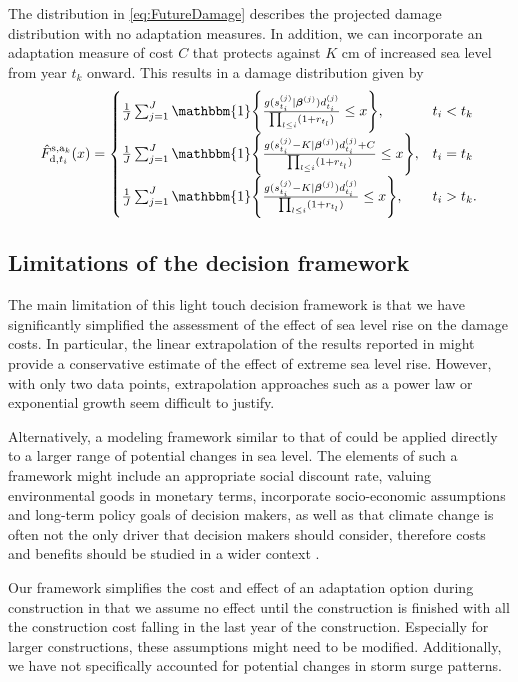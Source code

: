 \documentclass[note,screen,british,11pt]{nrdoc}
\begin{document}
The distribution in \eqref{eq:FutureDamage} describes the projected damage distribution with no adaptation measures. In addition, we can incorporate an adaptation measure of cost $C$ that protects against $K$ cm of increased sea level from year $t_k$ onward. This results in a damage distribution given by
  \[
  \hat{F}_{\textup{d}, t_i}^{\textup{s}, \textup{a}_k} (x) =
    \begin{cases}
      \frac{1}{J} \sum_{j=1}^J \mathbbm{1}\Bigg\{ \frac{g(s_{t_i}^{(j)}| \boldsymbol \beta^{(j)}) d_{t_i}^{(j)}}{\prod_{l \leq i} (1 + r_{t_l})} \leq x \Bigg\}, & t_i < t_k \\[2ex]
      \frac{1}{J} \sum_{j=1}^J \mathbbm{1}\Bigg\{ \frac{g(s_{t_i}^{(j)} - K| \boldsymbol \beta^{(j)}) d_{t_i}^{(j)} + C}{\prod_{l \leq i} (1 + r_{t_l})} \leq x \Bigg\}, & t_i = t_k \\[2ex]
      \frac{1}{J} \sum_{j=1}^J \mathbbm{1}\Bigg\{ \frac{g(s_{t_i}^{(j)} - K| \boldsymbol \beta^{(j)}) d_{t_i}^{(j)}}{\prod_{l \leq i} (1 + r_{t_l})} \leq x \Bigg\}, & t_i > t_k. \\
    \end{cases}
  \]

\subsection{Limitations of the decision framework}
The main limitation of this light touch decision framework is that we have significantly simplified the assessment of the effect of sea level rise on the damage costs. In particular, the linear extrapolation of the results reported in \citet{Hallegatte&2013} might provide a conservative estimate of the effect of extreme sea level rise. However, with only two data points, extrapolation approaches such as a power law or exponential growth seem difficult to justify.

Alternatively, a modeling framework similar to that of \citet{Hallegatte&2013} could be applied directly to a larger range of potential changes in sea level. The elements of such a framework might include an appropriate social discount rate, valuing environmental goods in monetary terms, incorporate socio-economic assumptions and long-term policy goals of decision makers, as well as that climate change is often not the only driver that decision makers should consider, therefore costs and benefits should be studied in a wider context \citep{Dittrich&2016}.

Our framework simplifies the cost and effect of an adaptation option during construction in that we assume no effect until the construction is finished with all the construction cost falling in the last year of the construction. Especially for larger constructions, these assumptions might need to be modified. Additionally, we have not specifically accounted for potential changes in storm surge patterns.
\end{document}
